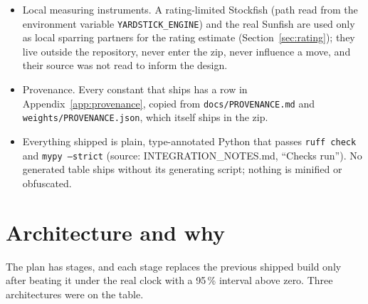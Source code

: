 \documentclass[11pt,a4paper]{article}
\newcommand{\src}[1]{{\small(source: #1)}}
\newcommand{\code}[1]{\texttt{#1}}
\begin{document}
\begin{itemize}[nosep]
        surface overlaps with known engines: the one found was the class-and-method pair
        \code{Searcher.search}, which Sunfish also uses; our class was renamed \code{Engine} even though
        everything behind it differs \src{DECISIONS.md, 2026-09-07 item F}. (3)~The generated tables were
        compared mechanically against the published tables of \textbf{Sunfish}, the Chess Programming
        Wiki's \textbf{``simplified evaluation function''}, \textbf{Rustic Alpha 3}, \textbf{TSCP} and
        \textbf{VICE}: whole-table comparisons and affine comparisons (does any table of ours equal a
        published one after multiplying by a constant and adding a constant?) were all clean, and a
        row-by-row comparison found exactly \textbf{one coincidental row}: the endgame pawn table's
        seventh rank is 50 in both ours and the CPW table, because our formula gives
        $14 \times 5^2 / 7 = 50$ there \src{DECISIONS.md, 2026-09-07 item I}.
  \item Local measuring instruments. A rating-limited Stockfish (path read from the environment variable
        \code{YARDSTICK\_ENGINE}) and the real Sunfish are used only as local sparring partners for the
        rating estimate (Section~\ref{sec:rating}); they live outside the repository, never enter the zip,
        never influence a move, and their source was not read to inform the design.
  \item Provenance. Every constant that ships has a row in Appendix~\ref{app:provenance}, copied from
        \code{docs/PROVENANCE.md} and \code{weights/PROVENANCE.json}, which itself ships in the zip.
  \item Everything shipped is plain, type-annotated Python that passes \code{ruff check} and
        \code{mypy --strict} \src{INTEGRATION\_NOTES.md, ``Checks run''}. No generated table ships without
        its generating script; nothing is minified or obfuscated.
\end{itemize}

\section{Architecture and why}\label{sec:arch}
The plan has stages, and each stage replaces the previous shipped build only after beating it under the
real clock with a 95\,\% interval above zero. Three architectures were on the table.
\end{document}
